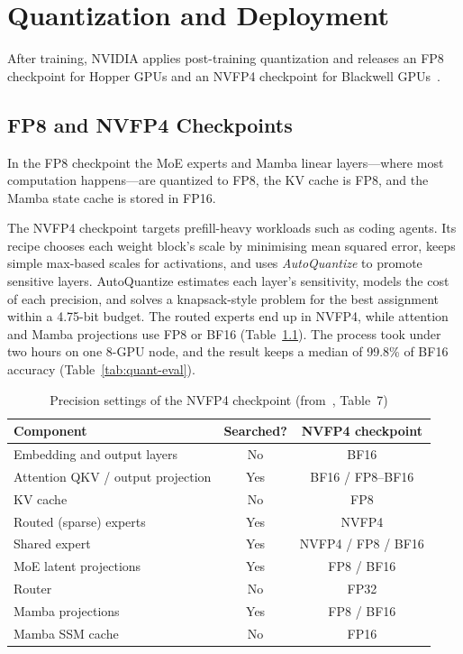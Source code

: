 \chapter{Quantization and Deployment}
\label{ch:quant}

After training, NVIDIA applies post-training quantization and releases an FP8
checkpoint for Hopper GPUs and an NVFP4 checkpoint for Blackwell
GPUs~\cite{nvidia2026super}.

\section{FP8 and NVFP4 Checkpoints}

In the FP8 checkpoint the MoE experts and Mamba linear layers---where most
computation happens---are quantized to FP8, the KV cache is FP8, and the Mamba
state cache is stored in FP16.

The NVFP4 checkpoint targets prefill-heavy workloads such as coding agents. Its
recipe chooses each weight block's scale by minimising mean squared error,
keeps simple max-based scales for activations, and uses \emph{AutoQuantize} to
promote sensitive layers. AutoQuantize estimates each layer's sensitivity,
models the cost of each precision, and solves a knapsack-style problem for the
best assignment within a 4.75-bit budget. The routed experts end up in NVFP4,
while attention and Mamba projections use FP8 or BF16
(Table~\ref{tab:precision-fp4}). The process took under two hours on one
8-GPU node, and the result keeps a median of 99.8\% of BF16 accuracy
(Table~\ref{tab:quant-eval}).

\begin{table}[!htbp]
\centering
\small
\caption[Precision settings of the NVFP4 checkpoint]{Precision settings of the
NVFP4 checkpoint (from~\cite{nvidia2026super}, Table~7)}
\label{tab:precision-fp4}
\begin{tabular}{@{}lcc@{}}
\toprule
\textbf{Component} & \textbf{Searched?} & \textbf{NVFP4 checkpoint} \\
\midrule
Embedding and output layers & No & BF16 \\
Attention QKV / output projection & Yes & BF16 / FP8--BF16 \\
KV cache & No & FP8 \\
Routed (sparse) experts & Yes & NVFP4 \\
Shared expert & Yes & NVFP4 / FP8 / BF16 \\
MoE latent projections & Yes & FP8 / BF16 \\
Router & No & FP32 \\
Mamba projections & Yes & FP8 / BF16 \\
Mamba SSM cache & No & FP16 \\
\bottomrule
\end{tabular}
\end{table}

